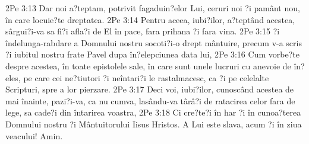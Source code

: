 2Pe 3:13  Dar noi a?teptam, potrivit fagaduin?elor Lui, ceruri noi ?i pamânt nou, în care locuie?te dreptatea.
2Pe 3:14  Pentru aceea, iubi?ilor, a?teptând acestea, sârgui?i-va sa fi?i afla?i de El în pace, fara prihana ?i fara vina.
2Pe 3:15  ?i îndelunga-rabdare a Domnului nostru socoti?i-o drept mântuire, precum v-a scris ?i iubitul nostru frate Pavel dupa în?elepciunea data lui,
2Pe 3:16  Cum vorbe?te despre acestea, în toate epistolele sale, în care sunt unele lucruri cu anevoie de în?eles, pe care cei ne?tiutori ?i neîntari?i le rastalmacesc, ca ?i pe celelalte Scripturi, spre a lor pierzare.
2Pe 3:17  Deci voi, iubi?ilor, cunoscând acestea de mai înainte, pazi?i-va, ca nu cumva, lasându-va târâ?i de ratacirea celor fara de lege, sa cade?i din întarirea voastra,
2Pe 3:18  Ci cre?te?i în har ?i în cunoa?terea Domnului nostru ?i Mântuitorului Iisus Hristos. A Lui este slava, acum ?i în ziua veacului! Amin.


